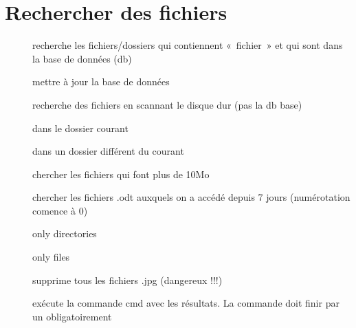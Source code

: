 \documentclass[letterpaper,10pt,french]{sphinxmanual}
\begin{document}
\chapter{Rechercher des fichiers}
\label{\detokenize{14-rechercher:rechercher-des-fichiers}}\label{\detokenize{14-rechercher::doc}}\begin{description}
\item[{}] \leavevmode
recherche les fichiers/dossiers qui contiennent « fichier » et qui sont dans la base de données (db)

\item[{}] \leavevmode
mettre à jour la base de données

\item[{}] \leavevmode
recherche des fichiers en scannant le disque dur (pas la db base)

\item[{}] \leavevmode
dans le dossier courant

\item[{}] \leavevmode
dans un dossier différent du courant

\item[{}] \leavevmode
chercher les fichiers qui font plus de 10Mo

\item[{}] \leavevmode
chercher les fichiers .odt auxquels on a accédé depuis 7 jours (numérotation comence à 0)

\item[{}] \leavevmode
only directories

\item[{}] \leavevmode
only files

\item[{}] \leavevmode
supprime tous les fichiers .jpg (dangereux !!!)

\item[{}] \leavevmode
exécute la commande cmd avec les résultats. La commande doit finir par un \sphinxcode{\sphinxupquote{\textbackslash{};}} obligatoirement

\end{description}
\end{document}
